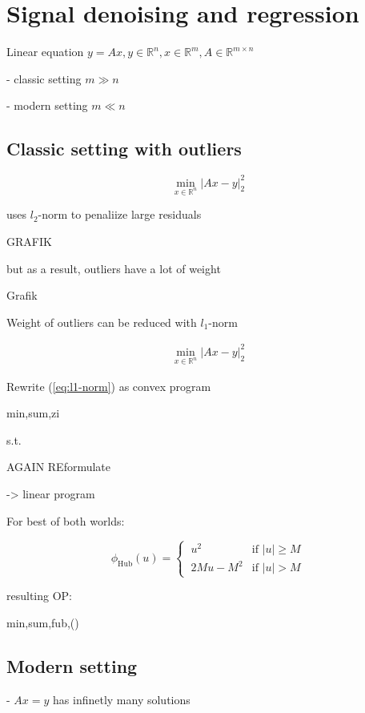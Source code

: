 \section{Signal denoising and regression}

Linear equation $y=Ax, y \in \mathbb{R}^{n}, x \in \mathbb{R}^{m}, A \in \mathbb{R}^{m \times n}$

- classic setting $m \gg n$

- modern setting $m \ll n$

\subsection{Classic setting with outliers}

$$\min_{x \in \mathbb{R}^{n}}|Ax-y|_2^2$$

uses $l_2$-norm to penaliize large residuals

GRAFIK

but as a result, outliers have a lot of weight

Grafik

Weight of outliers can be reduced with $l_1$-norm

\begin{equation}
	\begin{aligned}
		\min_{x \in \mathbb{R}^{n}}|Ax-y|_2^2
	\end{aligned}
	\label{eq:l1-norm}
\end{equation}

Rewrite (\ref{eq:l1-norm}) as convex program

min,sum,zi

s.t.

AGAIN REformulate

-> linear program

For best of both worlds:

$$\phi_\text{Hub}(u) =
	\begin{cases}
		\ u^2     & \text{if }|u|\ge M \\
		\ 2Mu-M^2 & \text{if }|u|>M
	\end{cases}$$

resulting  OP:

min,sum,fub,()

\subsection{Modern setting}

- $Ax=y$ has infinetly many solutions


